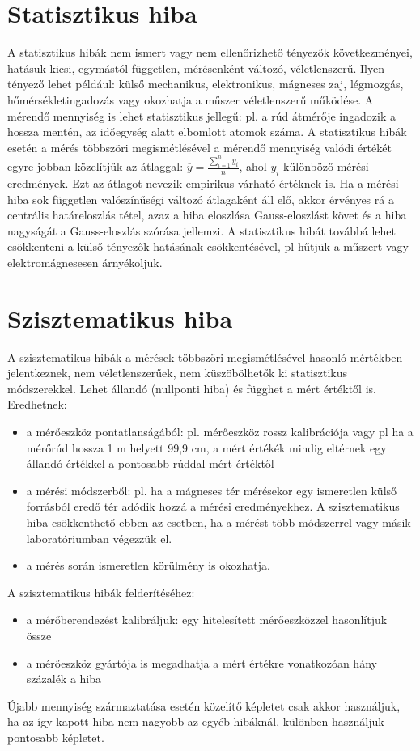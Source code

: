 \documentclass[12pt]{article}
\theoremstyle{plain}
\begin{document}
\section{Statisztikus hiba}
A statisztikus hibák nem ismert vagy nem ellenőrizhető tényezők következményei, hatásuk kicsi, egymástól független, mérésenként változó, véletlenszerű. Ilyen tényező lehet például: külső mechanikus, elektronikus, mágneses zaj, légmozgás, hőmérsékletingadozás vagy okozhatja a műszer véletlenszerű működése. A mérendő mennyiség is lehet statisztikus jellegű: pl. a rúd átmérője ingadozik a hossza mentén, az időegység alatt elbomlott atomok száma. A statisztikus hibák esetén a mérés többszöri megismétlésével a mérendő mennyiség valódi értékét egyre jobban közelítjük az átlaggal: $\overline{y} = \frac{\sum_{i=1}^{n} y_i}{n}$, ahol $y_i$ különböző mérési eredmények. Ezt az átlagot nevezik empirikus várható értéknek is.  Ha a mérési hiba sok független valószínűségi változó átlagaként áll
elő, akkor érvényes rá a centrális határeloszlás tétel, azaz a hiba eloszlása Gauss-eloszlást követ és a hiba nagyságát a Gauss-eloszlás szórása jellemzi. A statisztikus hibát továbbá lehet csökkenteni a külső tényezők hatásának csökkentésével, pl hűtjük a műszert vagy elektromágnesesen árnyékoljuk.






\section{Szisztematikus hiba}
A szisztematikus hibák a mérések többszöri megismétlésével hasonló mértékben jelentkeznek, nem véletlenszerűek, nem küszöbölhetők ki statisztikus módszerekkel. Lehet állandó (nullponti hiba) és függhet a mért értéktől is.  Eredhetnek: 
\begin{itemize}
    \item a mérőeszköz pontatlanságából: pl. mérőeszköz rossz kalibrációja vagy pl ha a mérőrúd hossza 1 m helyett 99,9 cm, a mért értékék mindig eltérnek egy állandó értékkel a pontosabb rúddal mért értéktől
    \item a mérési módszerből: pl. ha a mágneses tér mérésekor egy ismeretlen külső forrásból eredő tér adódik hozzá a mérési eredményekhez. A szisztematikus hiba csökkenthető ebben az esetben, ha a mérést több módszerrel vagy másik laboratóriumban végezzük el.
    \item a mérés során ismeretlen körülmény is okozhatja.
\end{itemize}
A szisztematikus hibák felderítéséhez:
\begin{itemize}
    \item a mérőberendezést kalibráljuk: egy hitelesített mérőeszközzel hasonlítjuk össze
    \item a mérőeszköz gyártója is megadhatja a mért értékre vonatkozóan hány százalék a hiba
\end{itemize}
Újabb mennyiség származtatása esetén közelítő képletet csak akkor használjuk, ha az így kapott hiba nem nagyobb az egyéb hibáknál, különben használjuk pontosabb képletet.
\end{document}
